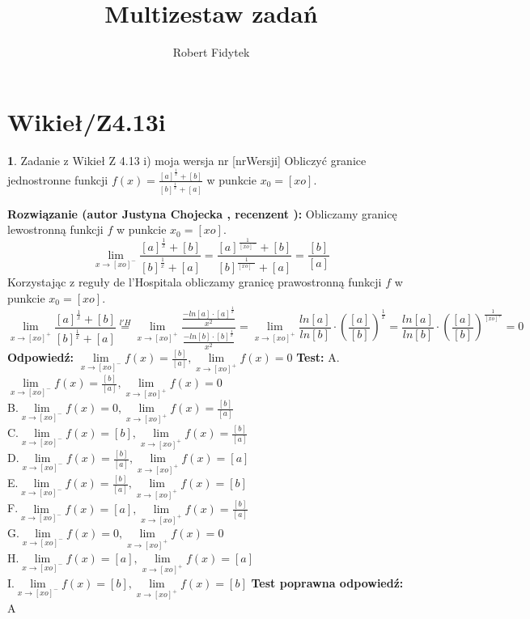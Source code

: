 \documentclass[12pt, a4paper]{article}
\title{Multizestaw zadań}
\author{Robert Fidytek}
\date{}
\theoremstyle{definition} %
\newtheorem{zad}{}
\newcommand{\kategoria}[1]{\section{#1}} %
\newcommand{\zadStart}[1]{\begin{zad}#1\newline} %
\newcommand{\zadStop}{\end{zad}}   %
\newcommand{\rozwStart}[2]{\noindent \textbf{Rozwiązanie (autor #1 , recenzent #2): }\newline} %
\newcommand{\rozwStop}{\newline}                                            %
\newcommand{\odpStart}{\noindent \textbf{Odpowiedź:}\newline}    %
\newcommand{\odpStop}{\newline}                                             %
\newcommand{\testStart}{\noindent \textbf{Test:}\newline} %
\newcommand{\testStop}{\newline} %
\newcommand{\kluczStart}{\noindent \textbf{Test poprawna odpowiedź:}\newline} %
\newcommand{\kluczStop}{\newline} %
\begin{document}
\maketitle


\kategoria{Wikieł/Z4.13i}
\zadStart{Zadanie z Wikieł Z 4.13 i) moja wersja nr [nrWersji]}
Obliczyć granice jednostronne funkcji $f(x)=\frac{[a]^{\frac{1}{x}}+[b]}{[b]^{\frac{1}{x}}+[a]}$ w punkcie $x_{0}=[xo]$. 
\zadStop
\rozwStart{Justyna Chojecka}{}
Obliczamy granicę lewostronną funkcji $f$ w punkcie $x_{0}=[xo]$.
$$\lim\limits_{x\to [xo]^{-}}\frac{[a]^{\frac{1}{x}}+[b]}{[b]^{\frac{1}{x}}+[a]}=\frac{[a]^{\frac{1}{[xo]^{-}}}+[b]}{[b]^{\frac{1}{[xo]^{-}}}+[a]}=\frac{[b]}{[a]}$$
Korzystając z reguły de l'Hospitala obliczamy granicę prawostronną funkcji $f$ w punkcie $x_0=[xo]$.
$$\lim\limits_{x\to [xo]^{+}}\frac{[a]^{\frac{1}{x}}+[b]}{[b]^{\frac{1}{x}}+[a]} \overset{l'H}{=}\lim\limits_{x\to [xo]^{+}}\frac{\frac{-ln[a]\cdot [a]^\frac{1}{x}}{x^{2}}}{\frac{-ln[b]\cdot [b]^{\frac{1}{x}}}{x^{2}}}=\lim\limits_{x\to [xo]^{+}}\frac{ln[a]}{ln[b]}\cdot \left(\frac{[a]}{[b]}\right)^{\frac{1}{x}}=\frac{ln[a]}{ln[b]}\cdot \left(\frac{[a]}{[b]}\right)^{\frac{1}{[xo]^{+}}}=0$$
\rozwStop
\odpStart
$\lim\limits_{x\to [xo]^{-}}f(x)=\frac{[b]}{[a]}, \lim\limits_{x\to [xo]^{+}}f(x)=0$
\odpStop
\testStart
A.$\lim\limits_{x\to [xo]^{-}}f(x)=\frac{[b]}{[a]}, \lim\limits_{x\to [xo]^{+}}f(x)=0$\\
B.$\lim\limits_{x\to [xo]^{-}}f(x)=0, \lim\limits_{x\to [xo]^{+}}f(x)=\frac{[b]}{[a]}$\\
C.$\lim\limits_{x\to [xo]^{-}}f(x)=[b], \lim\limits_{x\to [xo]^{+}}f(x)=\frac{[b]}{[a]}$\\
D.$\lim\limits_{x\to [xo]^{-}}f(x)=\frac{[b]}{[a]}, \lim\limits_{x\to [xo]^{+}}f(x)=[a]$\\
E.$\lim\limits_{x\to [xo]^{-}}f(x)=\frac{[b]}{[a]}, \lim\limits_{x\to [xo]^{+}}f(x)=[b]$\\
F.$\lim\limits_{x\to [xo]^{-}}f(x)=[a], \lim\limits_{x\to [xo]^{+}}f(x)=\frac{[b]}{[a]}$\\
G.$\lim\limits_{x\to [xo]^{-}}f(x)=0, \lim\limits_{x\to [xo]^{+}}f(x)=0$\\
H.$\lim\limits_{x\to [xo]^{-}}f(x)=[a], \lim\limits_{x\to [xo]^{+}}f(x)=[a]$\\
I.$\lim\limits_{x\to [xo]^{-}}f(x)=[b], \lim\limits_{x\to [xo]^{+}}f(x)=[b]$
\testStop
\kluczStart
A
\kluczStop
\end{document}
